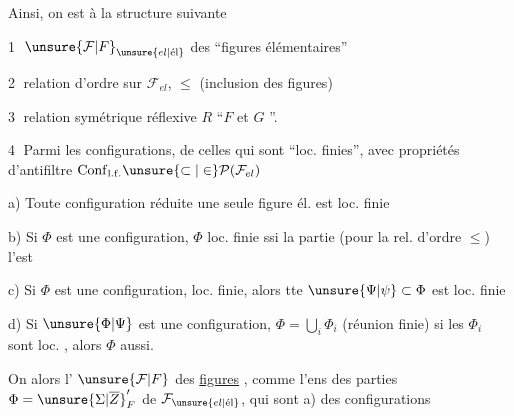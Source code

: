 
Ainsi, on est  à la structure suivante

\textcircled{1} $\unsure{\mathcal{F}|F}_{\unsure{el|\text{él}}}$  des ``figures élémentaires''

\textcircled{2} relation d'ordre sur $\mathcal{F}_{el}$, $\leq$ (inclusion des figures)

\textcircled{3} relation symétrique réflexive $R$  ``$F$ et $G$ \uline{}''.\  



\textcircled{4}  Parmi les configurations,      de celles qui sont ``loc. finies'', avec  propriétés d'antifiltre \unsure{;|,} $\mathrm{Conf}_{\mathrm{l.f.}}\unsure{\subset|\in}\mathcal{P}(\mathcal{F}_{el})$

a) Toute configuration réduite  une seule figure él. est loc. finie


b) Si $\Phi$ est une configuration, $\Phi$ loc. finie ssi la  partie  (pour la rel. d'ordre $\leq$) l'est

c) Si $\Phi$ est une configuration,  loc. finie, alors tte $\unsure{\Psi|\psi}\subset\Phi$ est loc. finie

d) Si $\unsure{\Phi|\Psi}$ est une configuration, $\Phi=\bigcup_{i}\Phi_i$ (réunion finie) si les $\Phi_i$ sont loc. , alors $\Phi$ aussi.

On  alors l' $\unsure{\mathcal{F}|F}$ des \uline{figures} , comme l'ens des parties $\Phi={\unsure{\Sigma|\overline{Z}}}'_{F}$ de $\mathcal{F}_{\unsure{el|\text{él}}}$, qui sont a) des configurations


